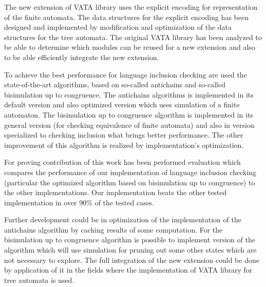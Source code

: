 The new extension of VATA library uses the explicit encoding for representation of the finite automata. 
The data structures for the explicit encoding has been designed
and implemented by modification and optimization of the data structures for the tree automata. The original VATA library has been analyzed to be able to determine
which modules can be reused for a new extension and also to be able efficiently integrate the new extension.

To achieve the best performance for language inclusion checking are used the state-of-the-art algorithms, based on so-called antichains and so-called bisimulation
up to congruence. The antichains algorithms is implemented in its default version and also optimized version which uses simulation of a finite automaton. 
The bisimulation up to congruence algorithm is implemented in its general version (for checking equivalence of finite automata) and also in
version specialized to checking inclusion what brings better performance. The other improvement of this algorithm is realized by implementation's optimization.

For proving contribution of this work has been performed evaluation which compares the performance of our implementation of language
inclusion checking (particular the optimized algorithm based on bisimulation up to congruence) to the other implementations. 
Our implementation beats the other tested implementation in over 90\% of the tested cases.

Further development could be in optimization of the implementation of the antichains algorithm by caching results of some computation. 
For the bisimulation up to congruence
algorithm is possible to implement version of the algorithm 
which will use simulation for pruning out some other states which are not necessary to explore. The full integration of the new extension could be done
by application of it in the fields where the implementation of VATA library for tree automata is used.
